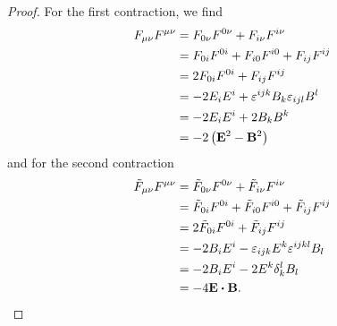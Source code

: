 \begin{proof}
	For the first contraction, we find
	\begin{equation*}
		\begin{split}
			F_{\mu\nu}
			F^{\mu\nu}
			&=
			F_{0\nu}
			F^{0\nu}
			+
			F_{i\nu}
			F^{i\nu}
			\\
			&=
			F_{0i}
			F^{0i}
			+
			F_{i0}
			F^{i0}
			+
			F_{ij}
			F^{ij}
			\\
			&=
			2
			F_{0i}
			F^{0i}
			+
			F_{ij}
			F^{ij}
			\\
			&=
			-2
			E_i
			E^i
			+
			\varepsilon^{ijk}B_k
			\varepsilon_{ijl}B^l
			\\
			&=
			-
			2
			E_i
			E^i
			+
			2
			B_k
			B^k
			\\
			&=
			-
			2
			\left(
				\vb{E}^2
				-
				\vb{B}^2
			\right)
		\end{split}
	\end{equation*}
	and for the second contraction
	\begin{equation*}
		\begin{split}
			\tilde{F}_{\mu\nu}
			F^{\mu\nu}
			&=
			\tilde{F}_{0\nu}
			F^{0\nu}
			+
			\tilde{F}_{i\nu}
			F^{i\nu}
			\\
			&=
			\tilde{F}_{0i}
			F^{0i}
			+
			\tilde{F}_{i0}
			F^{i0}
			+
			\tilde{F}_{ij}
			F^{ij}
			\\
			&=
			2
			\tilde{F}_{0i}
			F^{0i}
			+
			\tilde{F}_{ij}
			F^{ij}
			\\
			&=
			-
			2B_iE^i
			-
			\varepsilon_{ijk}E^k
			\varepsilon^{ijkl}B_l
			\\
			&=
			-
			2B_iE^i
			-
			2
			E^k
			\delta_k^l
			B_l
			\\
			&=
			-
			4
			\vb{E}\vdot\vb{B}
			.
		\end{split}
	\end{equation*}
\end{proof}

